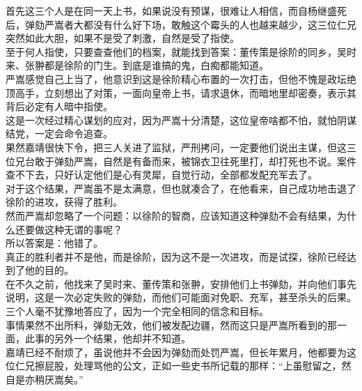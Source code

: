 \begin{multicols}{\theparacolNo}
首先这三个人是在同一天上书，如果说没有预谋，很难让人相信，而自杨继盛死后，弹劾严嵩者大都没有什么好下场，敢触这个霉头的人也越来越少，这三位仁兄突然如此大胆，如果不是受了刺激，自然是受了指使。\\

至于何人指使，只要查查他们的档案，就能找到答案：董传策是徐阶的同乡，吴时来、张翀都是徐阶的门生。到底是谁搞的鬼，白痴都能知道。\\

严嵩感觉自己上当了，他意识到这是徐阶精心布置的一次打击，但他不愧是政坛绝顶高手，立刻想出了对策，一面向皇帝上书，请求退休，而暗地里却密奏，表示其背后必定有人暗中指使。\\

这是一次经过精心谋划的应对，因为严嵩十分清楚，这位皇帝啥都不怕，就怕阴谋结党，一定会命令追查。\\

果然嘉靖很快下令，把三人关进了监狱，严刑拷问，一定要他们说出主谋，但这三位兄台敢于弹劾严嵩，自然是有备而来，被锦衣卫往死里打，却打死也不说。案件查不下去，只好认定他们是心有灵犀，自觉行动，全部都发配充军去了。\\

对于这个结果，严嵩虽不是太满意，但也就凑合了，在他看来，自己成功地击退了徐阶的进攻，获得了胜利。\\

然而严嵩却忽略了一个问题：以徐阶的智商，应该知道这种弹劾不会有结果，为什么还要做这种无谓的事呢？\\

所以答案是：他错了。\\

真正的胜利者并不是他，而是徐阶，因为这不是一次进攻，而是试探，徐阶已经达到了他的目的。\\

在不久之前，他找来了吴时来、董传策和张翀，安排他们上书弹劾，并向他们事先说明，这是一次必定失败的弹劾，而他们可能面对免职、充军，甚至杀头的后果。\\

三个人毫不犹豫地答应了，因为一个完全相同的信念和目标。\\

事情果然不出所料，弹劾无效，他们被发配边疆，然而这只是严嵩所看到的那一面，此事的另外一个结果，他却并不知道。\\

嘉靖已经不耐烦了，虽说他并不会因为弹劾而处罚严嵩，但长年累月，他都要为这位仁兄擦屁股，处理骂他的公文，正如一些史书所记载的那样：“上虽慰留之，然自是亦稍厌嵩矣。”\\


\end{multicols}

